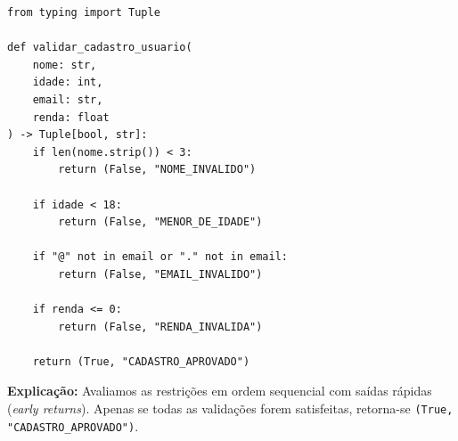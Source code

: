 \ifmostrarGabarito
\begin{verbatim}
from typing import Tuple

def validar_cadastro_usuario(
    nome: str, 
    idade: int, 
    email: str, 
    renda: float
) -> Tuple[bool, str]:
    if len(nome.strip()) < 3:
        return (False, "NOME_INVALIDO")
    
    if idade < 18:
        return (False, "MENOR_DE_IDADE")
        
    if "@" not in email or "." not in email:
        return (False, "EMAIL_INVALIDO")
        
    if renda <= 0:
        return (False, "RENDA_INVALIDA")
        
    return (True, "CADASTRO_APROVADO")
\end{verbatim}

\textbf{Explicação:}
Avaliamos as restrições em ordem sequencial com saídas rápidas (\emph{early returns}). Apenas se todas as validações forem satisfeitas, retorna-se \texttt{(True, "CADASTRO\_APROVADO")}.
\else
{}
\clearpage
{}
\clearpage
\fi
